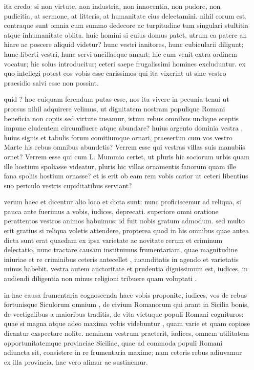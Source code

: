  ita credo: si non virtute, non industria, non innocentia, non pudore, non pudicitia, at sermone, at litteris, at humanitate eius delectamini. nihil eorum est, contraque sunt omnia cum summo dedecore ac turpitudine tum singulari stultitia atque inhumanitate oblita. huic homini si cuius domus patet, utrum ea patere an hiare ac poscere aliquid videtur? hunc vestri ianitores, hunc cubicularii diligunt; hunc liberti vestri, hunc servi ancillaeque amant; hic cum venit extra ordinem vocatur; hic solus introducitur; ceteri saepe frugalissimi homines excluduntur. ex quo intellegi potest eos vobis esse carissimos qui ita vixerint ut sine vestro praesidio salvi esse non possint.

 quid ? hoc cuiquam ferendum putas esse, nos ita vivere in pecunia tenui ut prorsus nihil adquirere velimus, ut dignitatem nostram populique Romani beneficia non copiis sed virtute tueamur, istum rebus omnibus undique ereptis impune eludentem circumfluere atque abundare? huius argento dominia vestra , huius signis et tabulis forum comitiumque ornari, praesertim cum vos vestro Marte his rebus omnibus abundetis? Verrem esse qui vestras villas suis manubiis ornet? Verrem esse qui cum L. Mummio certet, ut pluris hic sociorum urbis quam ille hostium spoliasse videatur, pluris hic villas ornamentis fanorum quam ille fana spoliis hostium ornasse? et is erit ob eam rem vobis carior ut ceteri libentius suo periculo vestris cupiditatibus serviant?

 verum haec et dicentur alio loco et dicta sunt: nunc proficiscemur ad reliqua, si pauca ante fuerimus a vobis, iudices, deprecati. superiore omni oratione perattentos vestros animos habuimus: id fuit nobis gratum admodum. sed multo erit gratius si reliqua voletis attendere, propterea quod in his omnibus quae antea dicta sunt erat quaedam ex ipsa varietate ac novitate rerum et criminum delectatio, nunc tractare causam instituimus frumentariam, quae magnitudine iniuriae et re criminibus ceteris antecellet , iucunditatis in agendo et varietatis minus habebit. vestra autem auctoritate et prudentia dignissimum est, iudices, in audiendi diligentia non minus religioni tribuere quam voluptati .

 in hac causa frumentaria cognoscenda haec vobis proponite, iudices, vos de rebus fortunisque Siculorum omnium , de civium Romanorum qui arant in Sicilia bonis, de vectigalibus a maioribus traditis, de vita victuque populi Romani cognituros: quae si magna atque adeo maxima vobis videbuntur , quam varie et quam copiose dicantur exspectare nolite. neminem vestrum praeterit, iudices, omnem utilitatem opportunitatemque provinciae Siciliae, quae ad commoda populi Romani adiuncta sit, consistere in re frumentaria maxime; nam ceteris rebus adiuvamur ex illa provincia, hac vero alimur ac sustinemur.


